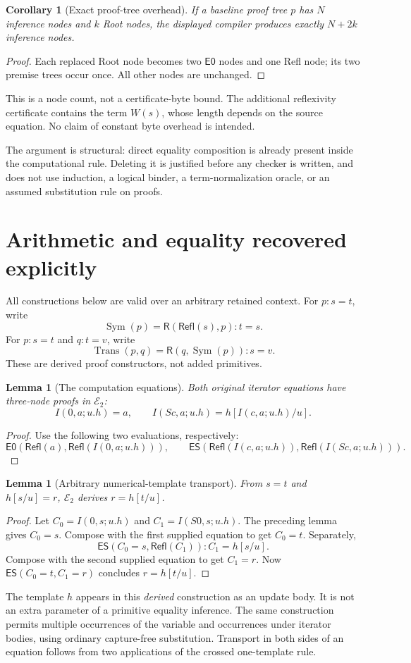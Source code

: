 \documentclass[11pt]{article}
\newtheorem{lemma}[theorem]{Lemma}
\newtheorem{corollary}[theorem]{Corollary}
\theoremstyle{definition}\newtheorem{definition}[theorem]{Definition}
\newcommand{\Rtwo}{\mathcal E_2}
\newcommand{\Refl}{\mathsf{Refl}}
\newcommand{\evz}{\mathsf{E0}}
\newcommand{\evs}{\mathsf{ES}}
\newcommand{\RC}{\mathsf{R}}
\begin{document}
\begin{corollary}[Exact proof-tree overhead]
If a baseline proof tree $p$ has $N$ inference nodes and $k$ Root nodes,
the displayed compiler produces exactly $N+2k$ inference nodes.
\end{corollary}
\begin{proof}
Each replaced Root node becomes two $\evz$ nodes and one Refl node;
its two premise trees occur once. All other nodes are unchanged.
\end{proof}
This is a node count, not a certificate-byte bound. The additional
reflexivity certificate contains the term $W(s)$, whose length depends
on the source equation. No claim of constant byte overhead is intended.

The argument is structural: direct equality composition is already
present inside the computational rule. Deleting it is justified before
any checker is written, and does not use induction, a logical binder,
a term-normalization oracle, or an assumed substitution rule on proofs.

\section{Arithmetic and equality recovered explicitly}

All constructions below are valid over an arbitrary retained context.
For $p:s=t$, write
\[
 \operatorname{Sym}(p)=\RC(\Refl(s),p):t=s.
\]
For $p:s=t$ and $q:t=v$, write
\[
 \operatorname{Trans}(p,q)=\RC(q,\operatorname{Sym}(p)):s=v.
\]
These are derived proof constructors, not added primitives.

\begin{lemma}[The computation equations]
Both original iterator equations have three-node proofs in $\Rtwo$:
\[
 I(0,a;u.h)=a,\qquad
 I(Sc,a;u.h)=h[I(c,a;u.h)/u].
\]
\end{lemma}
\begin{proof}
Use the following two evaluations, respectively:
\[
 \evz(\Refl(a),\Refl(I(0,a;u.h))),\qquad
 \evs(\Refl(I(c,a;u.h)),\Refl(I(Sc,a;u.h))).
\]
\end{proof}

\begin{lemma}[Arbitrary numerical-template transport]\label{lem:rawtr}
From $s=t$ and $h[s/u]=r$, $\Rtwo$ derives $r=h[t/u]$.
\end{lemma}
\begin{proof}
Let $C_0=I(0,s;u.h)$ and $C_1=I(S0,s;u.h)$.
The preceding lemma gives $C_0=s$. Compose with the first supplied
equation to get $C_0=t$. Separately,
\[
 \evs(C_0=s,\Refl(C_1)):C_1=h[s/u].
\]
Compose with the second supplied equation to get $C_1=r$. Now
$\evs(C_0=t,C_1=r)$ concludes $r=h[t/u]$.
\end{proof}
The template $h$ appears in this \emph{derived} construction as an update
body. It is not an extra parameter of a primitive equality inference.
The same construction permits multiple occurrences of the variable and
occurrences under iterator bodies, using ordinary capture-free
substitution. Transport in both sides of an equation follows from two
applications of the crossed one-template rule.
\end{document}
